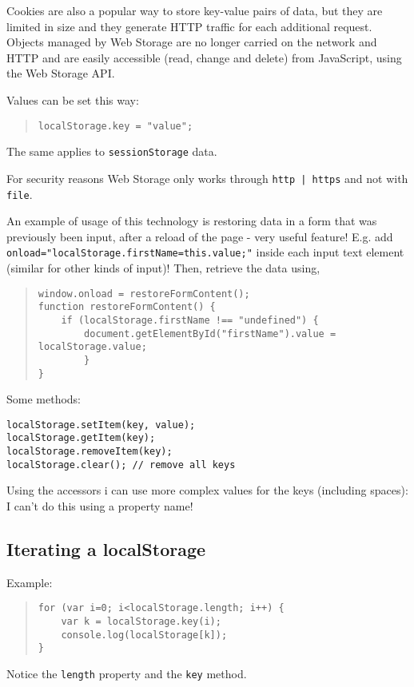 \documentclass[a4paper,11pt]{book}
\begin{document}
Cookies are also a popular way to store key-value pairs of data, but they are limited in size and they
generate HTTP traffic for each additional request. Objects managed by Web Storage are no longer carried
on the network and HTTP and are easily accessible (read, change and delete) from JavaScript, using the
Web Storage API.

Values can be set this way:
\begin{verse}
\begin{verbatim}
localStorage.key = "value";
\end{verbatim}
\end{verse}
The same applies to \texttt{sessionStorage} data.

For security reasons Web Storage only works through \texttt{http | https} and not with \texttt{file}.

An example of usage of this technology is restoring data in a form that was previously been input,
after a reload of the page - very useful feature! E.g. add
\texttt{onload="localStorage.firstName=this.value;"} inside each input text element (similar for other
kinds of input)! Then, retrieve the data using,
\begin{verse}
\begin{verbatim}
window.onload = restoreFormContent();
function restoreFormContent() {
	if (localStorage.firstName !== "undefined") {
		document.getElementById("firstName").value = localStorage.value;
		}
}
\end{verbatim}
\end{verse}

Some methods:
\begin{verbatim}
localStorage.setItem(key, value);
localStorage.getItem(key);
localStorage.removeItem(key);
localStorage.clear(); // remove all keys
\end{verbatim}
Using the accessors i can use more complex values for the keys (including spaces): I can't do this
using a property name!
\subsection{Iterating a localStorage}
Example:
\begin{verse}
\begin{verbatim}
for (var i=0; i<localStorage.length; i++) {
	var k = localStorage.key(i);
	console.log(localStorage[k]);
}
\end{verbatim}
\end{verse}
Notice the \texttt{length} property and the \texttt{key} method.
\end{document}
